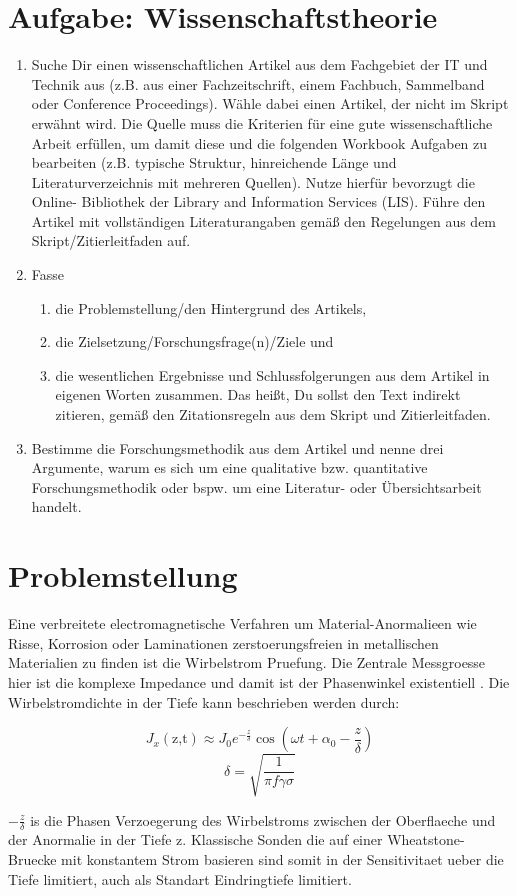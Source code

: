 \documentclass[11pt]{article}
\begin{document}
\section{Aufgabe: Wissenschaftstheorie}
\begin{enumerate}
    \item Suche Dir einen wissenschaftlichen Artikel aus dem Fachgebiet der IT und Technik aus (z.B. aus einer
Fachzeitschrift, einem Fachbuch, Sammelband oder Conference Proceedings). Wähle dabei einen Artikel,
der nicht im Skript erwähnt wird. Die Quelle muss die Kriterien für eine gute wissenschaftliche Arbeit
erfüllen, um damit diese und die folgenden Workbook Aufgaben zu bearbeiten (z.B. typische Struktur,
hinreichende Länge und Literaturverzeichnis mit mehreren Quellen). Nutze hierfür bevorzugt die Online-
Bibliothek der Library and Information Services (LIS). Führe den Artikel mit vollständigen
Literaturangaben gemäß den Regelungen aus dem Skript/Zitierleitfaden auf.
    \item Fasse
        \begin{enumerate}
            \item die Problemstellung/den Hintergrund des Artikels,
            \item die Zielsetzung/Forschungsfrage(n)/Ziele und
            \item die wesentlichen Ergebnisse und Schlussfolgerungen aus dem Artikel in eigenen Worten zusammen.
Das heißt, Du sollst den Text indirekt zitieren, gemäß den Zitationsregeln aus dem Skript und
Zitierleitfaden.
        \end{enumerate}
    \item Bestimme die Forschungsmethodik aus dem Artikel und nenne drei Argumente, warum es sich um eine
qualitative bzw. quantitative Forschungsmethodik oder bspw. um eine Literatur- oder Übersichtsarbeit
handelt.
\end{enumerate}
\newpage
\section{Problemstellung}
Eine verbreitete electromagnetische Verfahren um Material-Anormalieen wie Risse, Korrosion oder Laminationen zerstoerungsfreien in metallischen Materialien zu finden ist die Wirbelstrom Pruefung. Die Zentrale Messgroesse hier ist die komplexe Impedance und damit ist der Phasenwinkel existentiell \textcite{libby}. Die Wirbelstromdichte in der Tiefe kann beschrieben werden durch:
\begin{center}
\begin{equation}
J_x(\text{z,t}) \approx J_0e^{-\frac{z}{\delta}} \cos({\omega t + \alpha_0 - \frac{z}{\delta}})
\end{equation}
\begin{equation}
\delta = \sqrt{\frac{1}{\pi f \gamma \sigma}}
\end{equation}
\end{center}
$-\frac{z}{\delta}$ is die Phasen Verzoegerung des Wirbelstroms zwischen der Oberflaeche und der Anormalie in der Tiefe z. Klassische Sonden die auf einer Wheatstone-Bruecke mit konstantem Strom basieren sind somit in der Sensitivitaet ueber die Tiefe limitiert, auch als Standart Eindringtiefe \textcite{martin} limitiert.   
\end{document}
